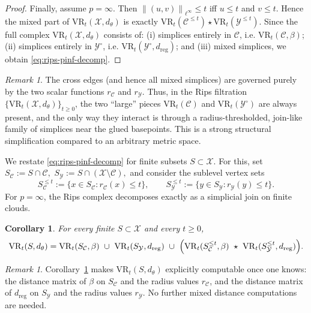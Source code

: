 \documentclass[11pt]{amsart}
\newtheorem{corollary}[theorem]{Corollary}
\theoremstyle{definition}
\theoremstyle{remark}
\newtheorem{remark}[theorem]{Remark}
\newcommand{\1}{\mathbbm{1}}
\newcommand{\norm}[1]{\left\lVert #1\right\rVert}
\newcommand{\VR}{\mathrm{VR}}
\begin{document}
\begin{proof}
\smallskip
\noindent

Finally, assume $p=\infty$. Then $\norm{(u,v)}_{\ell^\infty}\le t$ iff $u\le t$ and $v\le t$.
Hence the mixed part of \(\mathrm{VR}_t(\mathcal X,d_\theta)\) is exactly
$\mathrm{VR}_t(\mathcal C^{\le t})\star \mathrm{VR}_t(\mathcal Y^{\le t})$.
Since the full complex $\mathrm{VR}_t(\mathcal X,d_\theta)$ consists of:
(i) simplices entirely in $\mathcal C$, i.e. $\mathrm{VR}_t(\mathcal C,\beta)$;
(ii) simplices entirely in $\mathcal Y^\circ$, i.e. $\mathrm{VR}_t(\mathcal Y^\circ,d_{\mathrm{reg}})$;
and (iii) mixed simplices,
we obtain \eqref{eq:rips-pinf-decomp}. 
\end{proof}






\begin{remark}
The cross edges (and hence all mixed simplices) are governed purely by the two scalar functions
$r_{\mathcal C}$ and $r_{\mathcal Y}$.
Thus, in the Rips filtration $\{\mathrm{VR}_t(\mathcal X,d_\theta)\}_{t\ge 0}$, the two ``large'' pieces
$\mathrm{VR}_t(\mathcal C)$ and $\mathrm{VR}_t(\mathcal Y^\circ)$ are always present, and the only way they interact is through
a radius-thresholded, join-like family of simplices near the glued basepoints.
This is a strong structural simplification compared to an arbitrary metric space.
\end{remark}
We restate \eqref{eq:rips-pinf-decomp} for finite subsets $S\subset\mathcal X$. For this, set $S_{\mathcal C}:=S\cap\mathcal C,$ $S_{\mathcal Y}:=S\cap(\mathcal X\setminus\mathcal C),$ and consider the sublevel vertex sets
\[
S_{\mathcal C}^{\le t}:=\{x\in S_{\mathcal C}: r_{\mathcal C}(x)\le t\},
\qquad
S_{\mathcal Y}^{\le t}:=\{y\in S_{\mathcal Y}: r_{\mathcal Y}(y)\le t\}.
\]
For $p=\infty$, the Rips complex decomposes exactly as a simplicial join on finite clouds.
\begin{corollary}
\label{prop:rips_exact_pinf}
For every finite $S\subset\mathcal X$ and every $t\ge 0$,
\[
\VR_t(S,d_\theta)
=
\VR_t(S_{\mathcal C},\beta)\ \cup\ \VR_t(S_{\mathcal Y},d_{\mathrm{reg}})\
\cup\ \Bigl(\VR_t(S_{\mathcal C}^{\le t},\beta)\ \star\ \VR_t(S_{\mathcal Y}^{\le t},d_{\mathrm{reg}})\Bigr).
\]
\end{corollary}


\begin{remark}
Corollary~\ref{prop:rips_exact_pinf} makes $\VR_t(S,d_\theta)$ explicitly computable once one knows:
 the distance matrix of $\beta$ on $S_{\mathcal C}$ and the radius values $r_{\mathcal C}$, and 
the distance matrix of $d_{\mathrm{reg}}$ on $S_{\mathcal Y}$ and the radius values $r_{\mathcal Y}$.
No further mixed distance computations are needed.
\end{remark}
\end{document}

